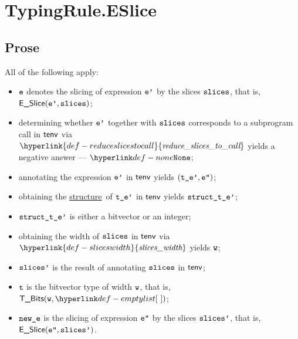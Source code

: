 \documentclass{book}
\newcommand\ProseOrTypeError[0]{\ProseTerminateAs{\TypeErrorConfig}}
\newcommand\sliceswidth[0]{\hyperlink{def-sliceswidth}{\textfunc{slices\_width}}}
\newcommand\structure[0]{\hyperlink{def-structure}{structure}}
\newcommand\reduceslicestocall[0]{\hyperlink{def-reduceslicestocall}{\textfunc{reduce\_slices\_to\_call}}}
\begin{document}

\section{TypingRule.ESlice \label{sec:TypingRule.ESlice}}

\subsection{Prose}
All of the following apply:
\begin{itemize}
  \item $\texttt{e}$ denotes the slicing of expression $\texttt{e'}$ by the slices $\texttt{slices}$, that is, \\
  $\textsf{E\_Slice}(\texttt{e'}, \texttt{slices})$;
  \item determining whether $\texttt{e'}$ together with $\texttt{slices}$ corresponds to a subprogram call
  in $\textsf{tenv}$ via $\reduceslicestocall$ yields a negative answer --- $\None$\ProseOrTypeError;
  \item annotating the expression $\texttt{e'}$ in $\textsf{tenv}$ yields $(\texttt{t\_e'},\texttt{e''})$\ProseOrTypeError;
  \item obtaining the \structure\ of $\texttt{t\_e'}$ in $\textsf{tenv}$ yields $\texttt{struct\_t\_e'}$\ProseOrTypeError;
  \item $\texttt{struct\_t\_e'}$ is either a bitvector or an integer;
  \item obtaining the width of $\texttt{slices}$ in $\textsf{tenv}$ via $\sliceswidth$ yields $\texttt{w}$\ProseOrTypeError;
  \item $\texttt{slices'}$ is the result of annotating $\texttt{slices}$ in $\textsf{tenv}$;
  \item $\texttt{t}$ is the bitvector type of width $\texttt{w}$, that is, $\TBits(\vw, \emptylist)$;
  \item $\texttt{new\_e}$ is the slicing of expression $\texttt{e''}$ by the slices $\texttt{slices'}$, that is, \\
  $\textsf{E\_Slice}(\texttt{e''}, \texttt{slices'})$.
\end{itemize}


\end{document}
